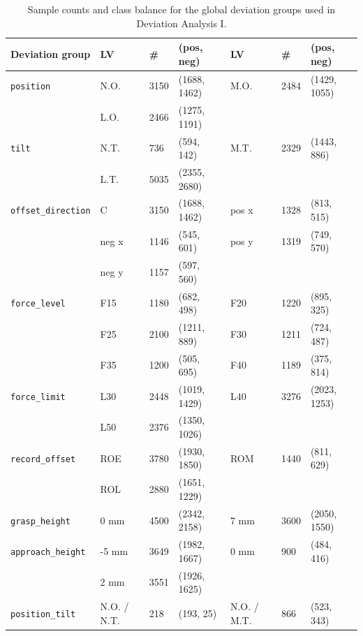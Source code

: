 \begin{table}[htbp]
    \centering
    \caption{Sample counts and class balance for the global deviation groups used in Deviation Analysis I.}
    \label{tab:da1_class_split_global}
    \begin{tabular}{l lll lll}
        \toprule
        \textbf{Deviation group} & \textbf{LV} & \textbf{\#} & \textbf{(pos, neg)} & \textbf{LV} & \textbf{\#} & \textbf{(pos, neg)}\\
        \midrule

        \texttt{position} & N.O. & 3150 & (1688, 1462) & M.O. & 2484 & (1429, 1055) \\
        & L.O. & 2466 & (1275, 1191) \\
        \midrule
        \texttt{tilt} & N.T. & 736 & (594, 142) & M.T. & 2329 & (1443, 886) \\
        & L.T. & 5035 & (2355, 2680) \\
        \midrule
        \texttt{offset\_direction} & C & 3150 & (1688, 1462) & pos x & 1328 & (813, 515) \\
        & neg x & 1146 & (545, 601) & pos y & 1319 & (749, 570) \\
        & neg y & 1157 & (597, 560) \\
        \midrule
        \texttt{force\_level} & F15 & 1180 & (682, 498) & F20 & 1220 & (895, 325) \\
        & F25 & 2100 & (1211, 889)  & F30 & 1211& (724, 487) \\
        & F35 & 1200 & (505, 695) & F40 & 1189 & (375, 814) \\
        \midrule
        \texttt{force\_limit} & L30 & 2448 & (1019, 1429) & L40 & 3276 & (2023, 1253) \\
        & L50 & 2376 & (1350, 1026) \\
        \midrule
        \texttt{record\_offset} & ROE & 3780 & (1930, 1850) & ROM & 1440 & (811, 629) \\
        & ROL & 2880 & (1651, 1229) \\
        \midrule
        \texttt{grasp\_height} & 0 mm & 4500 & (2342, 2158) & 7 mm & 3600 & (2050, 1550) \\
        \midrule
        \texttt{approach\_height} & -5 mm & 3649 & (1982, 1667) & 0 mm & 900 & (484, 416) \\
        & 2 mm & 3551 & (1926, 1625) \\
        \midrule
        \texttt{position\_tilt} & N.O. / N.T. & 218 & (193, 25) & N.O. / M.T. & 866 & (523, 343) \\

\end{tabular}
\end{table}
